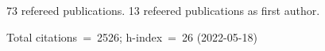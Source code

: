 73 refereed publications. 13 refeered publications as first author.

Total citations~=~2526; h-index~=~26 (2022-05-18)